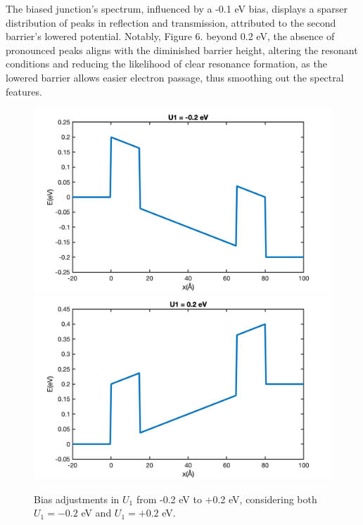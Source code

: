 \documentclass[twocolumn]{article}[ht]
\begin{document}
The biased junction's spectrum, influenced by a -0.1 eV bias, displays a sparser distribution of peaks in reflection and transmission, attributed to the second barrier's lowered potential. Notably, Figure 6. beyond 0.2 eV, the absence of pronounced peaks aligns with the diminished barrier height, altering the resonant conditions and reducing the likelihood of clear resonance formation, as the lowered barrier allows easier electron passage, thus smoothing out the spectral features.

\begin{figure}[ht]
    \centering
    \includegraphics[width=0.9\linewidth]{U1_-0.2.png}
    \includegraphics[width=0.9\linewidth]{U1_0.2.png}
    \caption{Bias adjustments in \( U_1 \) from -0.2 eV to +0.2 eV, considering both \( U_1 = -0.2 \) eV and \( U_1 = +0.2 \) eV.
    }
    \label{fig:example-8}


\end{figure}
\end{document}
